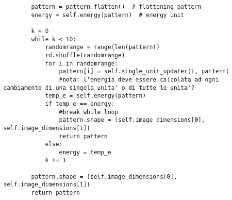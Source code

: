 \documentclass[letterpaper,twocolumn,10pt]{article}
\begin{document}
\begin{lstlisting}
        pattern = pattern.flatten()  # flattening pattern
        energy = self.energy(pattern)  # energy init

        k = 0
        while k < 10:
            randomrange = range(len(pattern))
            rd.shuffle(randomrange)
            for i in randomrange:
                pattern[i] = self.single_unit_updater(i, pattern)
                #nota: l'energia deve essere calcolata ad ogni cambiamento di una singola unita' o di tutte le unita'?
            temp_e = self.energy(pattern)
            if temp_e == energy:
                #break while loop
                pattern.shape = (self.image_dimensions[0], self.image_dimensions[1])
                return pattern
            else:
                energy = temp_e
            k += 1

        pattern.shape = (self.image_dimensions[0], self.image_dimensions[1])
        return pattern
\end{lstlisting}

\clearpage
\end{document}
